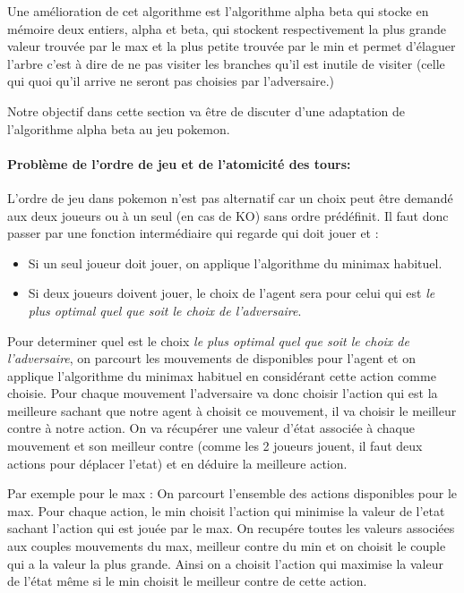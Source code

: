 			Une amélioration de cet algorithme est l'algorithme alpha beta qui stocke en mémoire deux entiers, alpha et beta, qui stockent respectivement la plus grande valeur 						trouvée par le max et la plus petite trouvée par le min et permet d'élaguer l'arbre c'est à dire de ne pas visiter les branches qu'il est inutile de visiter (celle qui quoi 						qu'il arrive ne seront pas choisies par l'adversaire.)

			Notre objectif dans cette section va être de discuter d'une adaptation de l'algorithme alpha beta au jeu pokemon.
			
			\paragraph{Problème de l'ordre de jeu et de l'atomicité des tours:}
				L'ordre de jeu dans pokemon n'est pas alternatif car un choix peut être demandé aux deux joueurs ou à un seul (en cas de KO) sans ordre prédéfinit. Il faut 							donc passer par une fonction intermédiaire qui regarde qui doit jouer et :
				\begin{itemize}
					\item Si un seul joueur doit jouer, on applique l'algorithme du minimax habituel.
					\item Si deux joueurs doivent jouer, le choix de l'agent sera pour celui qui est \emph{le plus optimal quel que soit le choix de l'adversaire}.
				\end{itemize}
			    \smallskip    			Pour determiner quel est le choix \emph{le plus optimal quel que soit le choix de l'adversaire}, on parcourt les mouvements de disponibles pour l'agent et on applique 				l'algorithme du minimax habituel en considérant cette action comme choisie. Pour chaque mouvement l'adversaire va donc choisir l'action qui est la meilleure sachant 					que notre agent à choisit ce mouvement, il va choisir le meilleur contre à notre action. On va récupérer une valeur d'état associée à chaque mouvement et son 						meilleur contre (comme les 2 joueurs jouent, il faut deux actions pour déplacer l'etat) et en déduire la meilleure action.
    
    			Par exemple pour le max : On parcourt l'ensemble des actions disponibles pour le max. Pour chaque action, le min choisit l'action qui minimise la valeur de l'etat 						sachant l'action qui est jouée par le max. On recupére toutes les valeurs associées aux couples mouvements du max, meilleur contre du min et on choisit le couple qui                                                          
    			a la valeur la plus grande. Ainsi on a choisit l'action qui maximise la valeur de l'état même si le min choisit le meilleur contre de cette action.
    			
